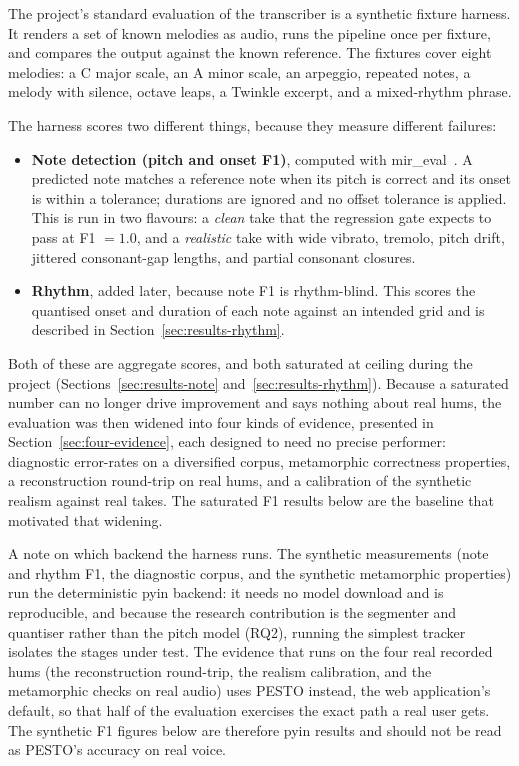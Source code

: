 \documentclass[12pt,a4paper]{article}
\begin{document}
The project's standard evaluation of the transcriber is a synthetic fixture
harness. It renders a
set of known melodies as audio, runs the pipeline once per fixture, and
compares the output against the known reference. The fixtures cover eight
melodies: a C major scale, an A minor scale, an arpeggio, repeated notes, a
melody with silence, octave leaps, a Twinkle excerpt, and a mixed-rhythm
phrase.

The harness scores two different things, because they measure different
failures:

\begin{itemize}
    \item \textbf{Note detection (pitch and onset F1)}, computed with
    mir\_eval~\cite{mireval}. A predicted note matches a reference note when its
    pitch is correct and its onset is within a tolerance; durations are ignored
    and no offset tolerance is applied. This is run in two flavours: a
    \emph{clean} take that the regression gate expects to pass at F1 $=1.0$, and
    a \emph{realistic} take with wide vibrato, tremolo, pitch drift, jittered
    consonant-gap lengths, and partial consonant closures.
    \item \textbf{Rhythm}, added later, because note F1 is rhythm-blind. This
    scores the quantised onset and duration of each note against an intended
    grid and is described in Section~\ref{sec:results-rhythm}.
\end{itemize}

Both of these are aggregate scores, and both saturated at ceiling during the
project (Sections~\ref{sec:results-note} and~\ref{sec:results-rhythm}). Because a
saturated number can no longer drive improvement and says nothing about real
hums, the evaluation was then widened into four kinds of evidence, presented in
Section~\ref{sec:four-evidence}, each designed to need no precise performer:
diagnostic error-rates on a diversified corpus, metamorphic correctness
properties, a reconstruction round-trip on real hums, and a calibration of the
synthetic realism against real takes. The saturated F1 results below are the
baseline that motivated that widening.

A note on which backend the harness runs. The synthetic measurements (note and
rhythm F1, the diagnostic corpus, and the synthetic metamorphic properties) run
the deterministic pyin backend: it needs no model download and is reproducible,
and because the research contribution is the segmenter and quantiser rather than
the pitch model (RQ2), running the simplest tracker isolates the stages under
test. The evidence that runs on the four real recorded hums (the reconstruction
round-trip, the realism calibration, and the metamorphic checks on real audio)
uses PESTO instead, the web application's default, so that half of the evaluation
exercises the exact path a real user gets. The synthetic F1 figures below are
therefore pyin results and should not be read as PESTO's accuracy on real voice.
\end{document}
